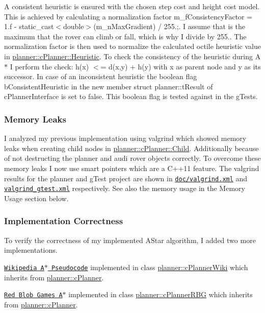 A consistent heuristic is ensured with the chosen step cost and height cost model. This is achieved by calculating a normalization factor {\ttfamily m\+\_\+f\+Consistency\+Factor = 1.\+f -\/ static\+\_\+cast$<$double$>$(m\+\_\+n\+Max\+Gradient) / 255.;}. I assume that {} is the maximum that the rover can climb or fall, which is why I divide by 255.. The normalization factor is then used to normalize the calculated octile heuristic value in \mbox{\hyperlink{classplanner_1_1c_planner_a77cefeae3d7a58a96c74b66f6be22611}{planner\+::c\+Planner\+::\+Heuristic}}. To check the consistency of the heuristic during A$\ast$ I perform the check\+: h(x) $<$= d(x,y) + h(y) with x as parent node and y as its successor. In case of an inconsistent heuristic the boolean flag b\+Consistent\+Heuristic in the new member struct planner\+::t\+Result of c\+Planner\+Interface is set to false. This boolean flag is tested against in the g\+Tests.

\subsubsection*{Memory Leaks}

I analyzed my previous implementation using valgrind which showed memory leaks when creating child nodes in \mbox{\hyperlink{classplanner_1_1c_planner_adbffc6ce05119c940a09369d7e61554e}{planner\+::c\+Planner\+::\+Child}}. Additionally because of not destructing the planner and audi rover objects correctly. To overcome these memory leaks I now use smart pointers which are a C++11 feature. The valgrind results for the planner and g\+Test project are shown in \href{doc/valgrind.xml}{\tt doc/valgrind.\+xml} and \href{valgrind_gtest.xml}{\tt valgrind\+\_\+gtest.\+xml} respectively. See also the memory usage in the Memory Usage section below.

\subsubsection*{Implementation Correctness}

To verify the correctness of my implemented A\+Star algorithm, I added two more implementations.
\begin{DoxyEnumerate}
\item \href{https://en.wikipedia.org/wiki/A*_search_algorithm#Pseudocode}{\tt Wikipedia A$\ast$ Pseudocode} implemented in class \mbox{\hyperlink{classplanner_1_1c_planner_wiki}{planner\+::c\+Planner\+Wiki}} which inherits from \mbox{\hyperlink{classplanner_1_1c_planner}{planner\+::c\+Planner}}.
\item \href{https://www.redblobgames.com/pathfinding/a-star/implementation.html#cplusplus}{\tt Red Blob Games A$\ast$} implemented in class \mbox{\hyperlink{classplanner_1_1c_planner_r_b_g}{planner\+::c\+Planner\+R\+BG}} which inherits from \mbox{\hyperlink{classplanner_1_1c_planner}{planner\+::c\+Planner}}.
\end{DoxyEnumerate}

